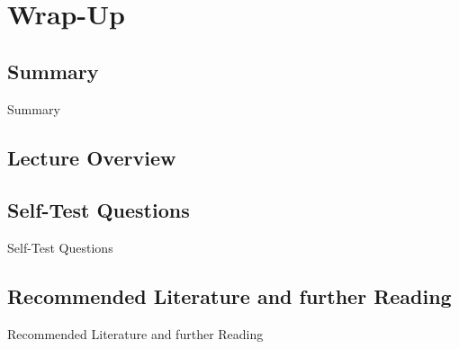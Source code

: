 \section{Wrap-Up}

\subsection{Summary}

\begin{frame}{Summary}{}

\end{frame}


\subsection{Lecture Overview}



\subsection{Self-Test Questions}

\begin{frame}{Self-Test Questions}{}

\end{frame}


\subsection{Recommended Literature and further Reading}

\begin{frame}{Recommended Literature and further Reading}{}
	\footnotesize
	\begin{thebibliography}{2}

	\end{thebibliography}
\end{frame}


\makethanks

